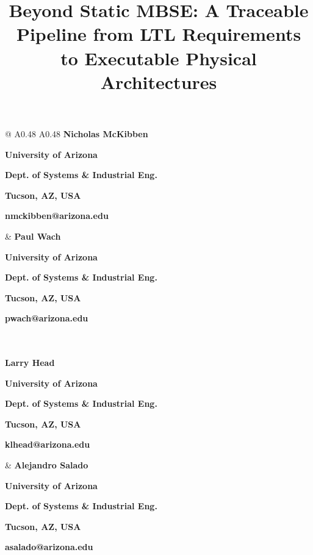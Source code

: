 \documentclass[11pt,letterpaper]{article} %
\author{\mbox{}}
\date{}
\title{Beyond Static MBSE: A Traceable Pipeline from LTL Requirements to Executable Physical Architectures}
\newcommand{\headingfont}{\sffamily}
\newcommand{\authorcard}[5]{%
  {\headingfont\bfseries\fontsize{12pt}{14pt}\selectfont #1}\par
  {\headingfont\bfseries\fontsize{12pt}{14pt}\selectfont #2}\par
  {\headingfont\bfseries\fontsize{12pt}{14pt}\selectfont #3}\par
  {\headingfont\bfseries\fontsize{12pt}{14pt}\selectfont #4}\par
  {\headingfont\bfseries\fontsize{12pt}{14pt}\selectfont #5}\par
}
\begin{document}
\maketitle
\thispagestyle{firstpage}

\noindent
\begin{tabular*}{\textwidth}{@{\extracolsep{\fill}} A{0.48\textwidth} A{0.48\textwidth}}
  \authorcard{Nicholas McKibben}{University of Arizona}{Dept. of Systems \& Industrial Eng.}{Tucson, AZ, USA}{nmckibben@arizona.edu} &
  \authorcard{Paul Wach}{University of Arizona}{Dept. of Systems \& Industrial Eng.}{Tucson, AZ, USA}{pwach@arizona.edu} \\
   \\[-0.2\baselineskip]
  \authorcard{Larry Head}{University of Arizona}{Dept. of Systems \& Industrial Eng.}{Tucson, AZ, USA}{klhead@arizona.edu} &
  \authorcard{Alejandro Salado}{University of Arizona}{Dept. of Systems \& Industrial Eng.}{Tucson, AZ, USA}{asalado@arizona.edu}
\end{tabular*}
\vspace{.25in}
\end{document}
